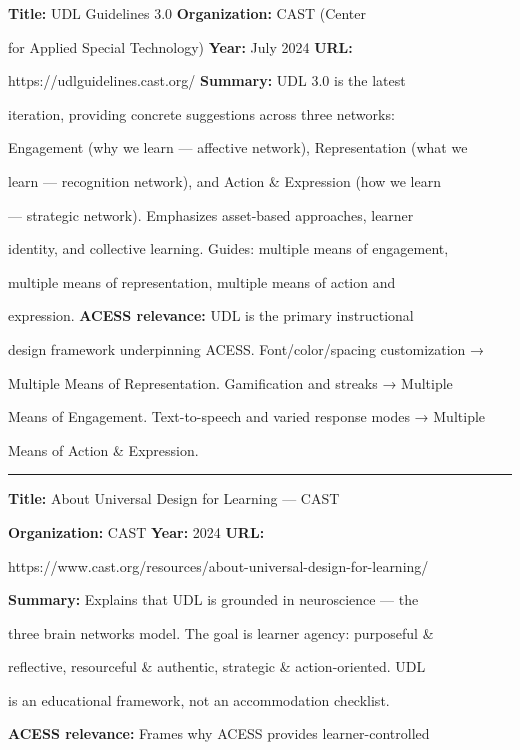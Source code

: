\documentclass[12pt, oneside]{article} %
\begin{document}
\textbf{Title:} UDL Guidelines 3.0 \textbf{Organization:} CAST (Center

for Applied Special Technology) \textbf{Year:} July 2024 \textbf{URL:}

https://udlguidelines.cast.org/ \textbf{Summary:} UDL 3.0 is the latest

iteration, providing concrete suggestions across three networks:

Engagement (why we learn --- affective network), Representation (what we

learn --- recognition network), and Action \& Expression (how we learn

--- strategic network). Emphasizes asset-based approaches, learner

identity, and collective learning. Guides: multiple means of engagement,

multiple means of representation, multiple means of action and

expression. \textbf{ACESS relevance:} UDL is the primary instructional

design framework underpinning ACESS. Font/color/spacing customization →

Multiple Means of Representation. Gamification and streaks → Multiple

Means of Engagement. Text-to-speech and varied response modes → Multiple

Means of Action \& Expression.



\begin{center}\rule{0.5\linewidth}{0.5pt}\end{center}



\textbf{Title:} About Universal Design for Learning --- CAST

\textbf{Organization:} CAST \textbf{Year:} 2024 \textbf{URL:}

https://www.cast.org/resources/about-universal-design-for-learning/

\textbf{Summary:} Explains that UDL is grounded in neuroscience --- the

three brain networks model. The goal is learner agency: purposeful \&

reflective, resourceful \& authentic, strategic \& action-oriented. UDL

is an educational framework, not an accommodation checklist.

\textbf{ACESS relevance:} Frames why ACESS provides learner-controlled
\end{document}
